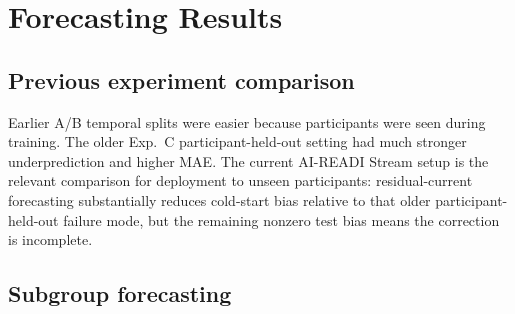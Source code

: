 \section{Forecasting Results}
\label{sec:results}

\GeneratedForecastingInterpretation

\GeneratedForecastingTables

\GeneratedForecastingFigures

\subsection{Previous experiment comparison}
Earlier A/B temporal splits were easier because participants were seen during training. The older Exp.~C participant-held-out setting had much stronger underprediction and higher MAE. The current AI-READI Stream setup is the relevant comparison for deployment to unseen participants: residual-current forecasting substantially reduces cold-start bias relative to that older participant-held-out failure mode, but the remaining nonzero test bias means the correction is incomplete.

\subsection{Subgroup forecasting}
\GeneratedSubgroupInterpretation

\GeneratedSubgroupTables


